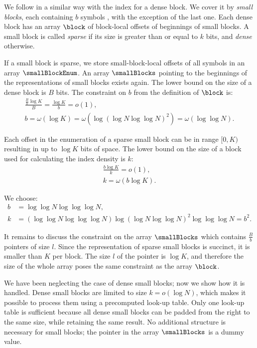 \bigbreak

We follow in a similar way with the index for a dense block.
We cover it by \emph{small blocks}, each containing $b$ symbols \ph{}, with the exception of the last one.
Each dense block has an array $\block$ of block-local offsets of beginnings of small blocks.
A small block is called \emph{sparse} if its size is greater than or equal to $k$ bits, and \emph{dense} otherwise.

If a small block is sparse, we store small-block-local offsets of all symbols \ph{} in an array $\smallBlockEnum$.
An array $\smallBlocks$ pointing to the beginnings of the representations of small blocks exists again.
The lower bound on the size of a dense block is $B$ bits.
The constraint on $b$ from the definition of $\block$ is:
\begin{gather*}
\frac{\frac{B}{b} \log K}{B} = \frac{\log K}{b} = o(1), \\
b = \omega(\log K) = \omega(\log(\log N \log \log N)^2) = \omega(\log \log N).
\end{gather*}

Each offset in the enumeration of a sparse small block can be in range $[0, K)$ resulting in up to $\log K$ bits of space.
The lower bound on the size of a block used for calculating the index density is $k$:
\begin{gather*}
\frac{b \log K}{k} = o(1), \\
k = \omega(b\log K).
\end{gather*}

We choose:
\begin{align*}
b &= \log \log N \log \log \log N, \\
k &= (\log \log N \log \log \log N) \log(\log N \log \log N)^2 \log \log \log N = b^2.
\end{align*}

It remains to discuss the constraint on the array $\smallBlocks$ which contains $\frac{B}{b}$ pointers of size $l$.
Since the representation of sparse small blocks is succinct, it is smaller than $K$ per block.
The size $l$ of the pointer is $\log K$, and therefore the size of the whole array poses the same constraint as the array $\block$.

\bigbreak

We have been neglecting the case of dense small blocks; now we show how it is handled.
Dense small blocks are limited to size $k = o(\log N)$, which makes it possible to process them using a precomputed look-up table.
Only one look-up table is sufficient because all dense small blocks can be padded from the right to the same size, while retaining the same result.
No additional structure  is necessary for small blocks; the pointer in the array $\smallBlocks$ is a dummy value.

